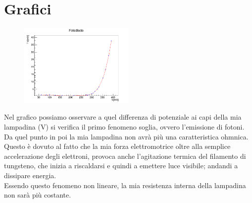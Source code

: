 \documentclass[10pt,twocolumn]{article}
\begin{document}
\twocolumn

\section{Grafici}
\begin{figure}[H] %
  \centering
  \includegraphics[width=0.5\textwidth]{curva_voltammetrica/fotodiodo.png} %
  \label{fig:I/V_fotodiodo}
\end{figure}
Nel grafico possiamo osservare a quel differenza di potenziale ai capi della mia lampadina (V) si verifica il primo fenomeno soglia, ovvero l'emissione di fotoni. Da quel punto in poi la mia lampadina non avrà più una caratteristica ohmnica. Questo è dovuto al fatto che la mia forza elettromotrice oltre alla semplice accelerazione degli elettroni, provoca anche l'agitazione termica del filamento di tungsteno, che inizia a riscaldarsi e quindi a emettere luce visibile; andandi a dissipare energia. \\
Essendo questo fenomeno non lineare, la mia resistenza interna della lampadina non sarà più costante. 
\end{document}

